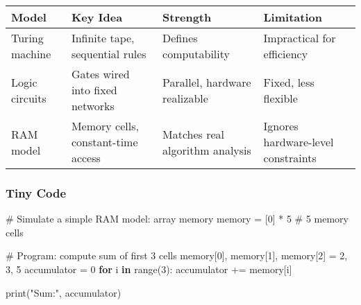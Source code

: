 \documentclass[
  letterpaper,
  DIV=11,
  numbers=noendperiod]{scrreprt}
\newenvironment{Shaded}{\begin{snugshade}}{\end{snugshade}}
\newcommand{\BuiltInTok}[1]{\textcolor[rgb]{0.00,0.23,0.31}{#1}}
\newcommand{\CommentTok}[1]{\textcolor[rgb]{0.37,0.37,0.37}{#1}}
\newcommand{\ControlFlowTok}[1]{\textcolor[rgb]{0.00,0.23,0.31}{\textbf{#1}}}
\newcommand{\DecValTok}[1]{\textcolor[rgb]{0.68,0.00,0.00}{#1}}
\newcommand{\KeywordTok}[1]{\textcolor[rgb]{0.00,0.23,0.31}{\textbf{#1}}}
\newcommand{\NormalTok}[1]{\textcolor[rgb]{0.00,0.23,0.31}{#1}}
\newcommand{\OperatorTok}[1]{\textcolor[rgb]{0.37,0.37,0.37}{#1}}
\newcommand{\StringTok}[1]{\textcolor[rgb]{0.13,0.47,0.30}{#1}}
\begin{document}
\begin{longtable}[]{@{}
  >{\raggedright\arraybackslash}p{}
  >{\raggedright\arraybackslash}p{}
  >{\raggedright\arraybackslash}p{}
  >{\raggedright\arraybackslash}p{}@{}}
\toprule\noalign{}
\begin{minipage}[b]{\linewidth}\raggedright
Model
\end{minipage} & \begin{minipage}[b]{\linewidth}\raggedright
Key Idea
\end{minipage} & \begin{minipage}[b]{\linewidth}\raggedright
Strength
\end{minipage} & \begin{minipage}[b]{\linewidth}\raggedright
Limitation
\end{minipage} \\
\midrule\noalign{}
\endhead
\bottomrule\noalign{}
\endlastfoot
Turing machine & Infinite tape, sequential rules & Defines computability
& Impractical for efficiency \\
Logic circuits & Gates wired into fixed networks & Parallel, hardware
realizable & Fixed, less flexible \\
RAM model & Memory cells, constant-time access & Matches real algorithm
analysis & Ignores hardware-level constraints \\
\end{longtable}

\subsubsection{Tiny Code}\label{tiny-code-31}

\begin{Shaded}
\begin{Highlighting}[]
\CommentTok{\# Simulate a simple RAM model: array memory}
\NormalTok{memory }\OperatorTok{=}\NormalTok{ [}\DecValTok{0}\NormalTok{] }\OperatorTok{*} \DecValTok{5}  \CommentTok{\# 5 memory cells}

\CommentTok{\# Program: compute sum of first 3 cells}
\NormalTok{memory[}\DecValTok{0}\NormalTok{], memory[}\DecValTok{1}\NormalTok{], memory[}\DecValTok{2}\NormalTok{] }\OperatorTok{=} \DecValTok{2}\NormalTok{, }\DecValTok{3}\NormalTok{, }\DecValTok{5}
\NormalTok{accumulator }\OperatorTok{=} \DecValTok{0}
\ControlFlowTok{for}\NormalTok{ i }\KeywordTok{in} \BuiltInTok{range}\NormalTok{(}\DecValTok{3}\NormalTok{):}
\NormalTok{    accumulator }\OperatorTok{+=}\NormalTok{ memory[i]}

\BuiltInTok{print}\NormalTok{(}\StringTok{"Sum:"}\NormalTok{, accumulator)}
\end{Highlighting}
\end{Shaded}
\end{document}
